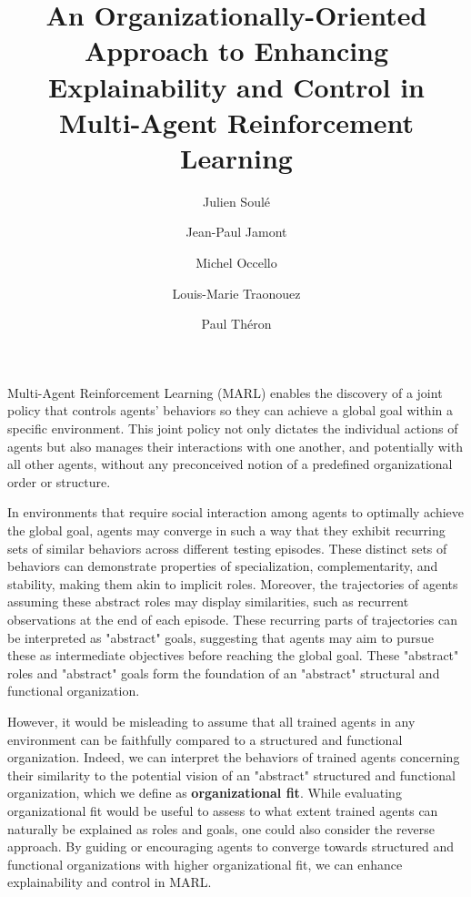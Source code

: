 \documentclass[sigconf,anonymous]{aamas}
\title[AAMAS-2025 CybMASDE]{An Organizationally-Oriented Approach to Enhancing Explainability and Control in Multi-Agent Reinforcement Learning}
\author{Julien Soulé}
\affiliation{
  \institution{Univ. Grenoble Alpes}
  \city{Valence}
  \country{France}}
\author{Jean-Paul Jamont}
\affiliation{
  \institution{Univ. Grenoble Alpes}
  \city{Valence}
  \country{France}}
\author{Michel Occello}
\affiliation{
  \institution{Univ. Grenoble Alpes}
  \city{Valence}
  \country{France}}
\author{Louis-Marie Traonouez}
\affiliation{
  \institution{Thales Land and Air Systems, BU IAS}
  \city{Rennes}
  \country{France}}
\author{Paul Théron}
\affiliation{
  \institution{AICA IWG}
  \city{La Guillermie}
  \country{France}}
\begin{document}

\pagestyle{fancy}
\fancyhead{}


\maketitle


Multi-Agent Reinforcement Learning (MARL) enables the discovery of a joint policy that controls agents' behaviors so they can achieve a global goal within a specific environment. 
This joint policy not only dictates the individual actions of agents but also manages their interactions with one another, and potentially with all other agents, without any preconceived notion of a predefined organizational order or structure. 

In environments that require social interaction among agents to optimally achieve the global goal, agents may converge in such a way that they exhibit recurring sets of similar behaviors across different testing episodes. 
These distinct sets of behaviors can demonstrate properties of specialization, complementarity, and stability, making them akin to implicit roles. Moreover, the trajectories of agents assuming these abstract roles may display similarities, such as recurrent observations at the end of each episode. These recurring parts of trajectories can be interpreted as "abstract" goals, suggesting that agents may aim to pursue these as intermediate objectives before reaching the global goal. These "abstract" roles and "abstract" goals form the foundation of an "abstract" structural and functional organization.

However, it would be misleading to assume that all trained agents in any environment can be faithfully compared to a structured and functional organization. Indeed, we can interpret the behaviors of trained agents concerning their similarity to the potential vision of an "abstract" structured and functional organization, which we define as \textbf{organizational fit}.
While evaluating organizational fit would be useful to assess to what extent trained agents can naturally be explained as roles and goals, one could also consider the reverse approach. By guiding or encouraging agents to converge towards structured and functional organizations with higher organizational fit, we can enhance explainability and control in MARL.
\end{document}

